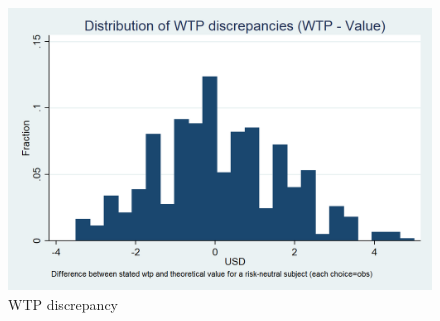 \documentclass[12pt,a4paper]{article}
\begin{document}
\begin{figure}[H]
\centering
\caption{WTP discrepancy} \label{WTP_discrepancy_fig}

  \centering
  \includegraphics[scale=0.3]{Graphs/hist_WTP_discr1.png}

\end{figure}
\end{document}
